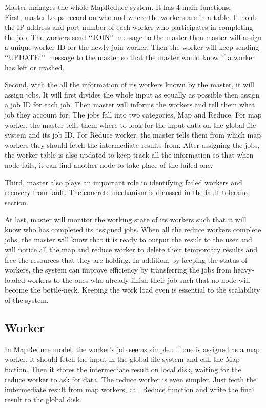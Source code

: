 \documentclass[12pt]{article}
\begin{document}
Master manages the whole MapReduce system. It has 4 main functions: \\
First, master keeps record on who and where the workers are in a table. It holds the IP address and 
port number of each worker who participates in completing the job. The workers send \lq\lq JOIN\rq\rq\  
message to the master then master will assign a unique worker ID for the newly join worker.
Then the worker will keep sending \lq\lq UPDATE \rq\rq\ message to the master so that the master would know
if a worker has left or crashed.
  
Second, with the all the information of its workers known by the master, it will assign jobs. It will
first divides the whole input as equally as possible then assign a job ID for each job. Then master will informs the workers and tell them 
what job they account for. The jobs fall into two categories, Map and Reduce. For map worker, the master tells
them where to look for the input data on the global file system and its job ID. For Reduce worker, the master tells
them from which map workers they should fetch the intermediate results from. After assigning the jobs, the worker table
is also updated to keep track all the information so that when node fails, it can find another node to take place of the 
failed one.

Third, master also plays an important role in identifying failed workers and recovery from fault. The concrete mechanism
is dicussed in the fault tolerance section.

At last, master will monitor the working state of its workers such that it will know who has completed its assigned jobs. When all 
the reduce workers complete jobs, the master will know that it is ready to output the result to the user and will notice all the map and
reduce worker to delete their temporoary results and free the resources that they are holding. In addition, by keeping the status of workers,
the system can improve efficiency by transferring the jobs from heavy-loaded workers to the ones who already finish their job such that no
node will become the bottle-neck. Keeping the work load even is essential to the scalability of the system.   
\subsection{Worker}

In MapReduce model, the worker's job seems simple : if one is assigned as a map worker, it should fetch the input in the global file system and
call the Map fuction. Then it stores the intermediate result on local disk, waiting for the reduce worker to ask for data. The reduce worker
is even simpler. Just fecth the imtermediate result from map workers, call Reduce function and write the final result to the global disk. 
\end{document}
